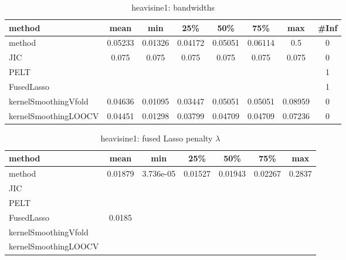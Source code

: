 \begin{table}[ht]
\centering
\begin{tabular}{l|c|ccccc|c}
  \hline
method & mean & min & 25\% & 50\% & 75\% & max & \#Inf \\ 
  \hline
method & 0.05233 & 0.01326 & 0.04172 & 0.05051 & 0.06114 &   0.5 &   0 \\ 
  JIC & 0.075 & 0.075 & 0.075 & 0.075 & 0.075 & 0.075 &   0 \\ 
  PELT &  &  &  &  &  &  &   1 \\ 
  FusedLasso &  &  &  &  &  &  &   1 \\ 
  kernelSmoothingVfold & 0.04636 & 0.01095 & 0.03447 & 0.05051 & 0.05051 & 0.08959 &   0 \\ 
  kernelSmoothingLOOCV & 0.04451 & 0.01298 & 0.03799 & 0.04709 & 0.04709 & 0.07236 &   0 \\ 
   \hline
\end{tabular}
\caption{heavisine1: bandwidths} 
\label{tab:heavisine1Bandwidths}
\end{table}
\begin{table}[ht]
\centering
\begin{tabular}{l|c|ccccc}
  \hline
method & mean & min & 25\% & 50\% & 75\% & max \\ 
  \hline
method & 0.01879 & 3.736e-05 & 0.01527 & 0.01943 & 0.02267 & 0.2837 \\ 
  JIC &  &  &  &  &  &  \\ 
  PELT &  &  &  &  &  &  \\ 
  FusedLasso & 0.0185 &  &  &  &  &  \\ 
  kernelSmoothingVfold &  &  &  &  &  &  \\ 
  kernelSmoothingLOOCV &  &  &  &  &  &  \\ 
   \hline
\end{tabular}
\caption{heavisine1: fused Lasso penalty $\lambda$} 
\label{tab:heavisine1Lambdas}
\end{table}
